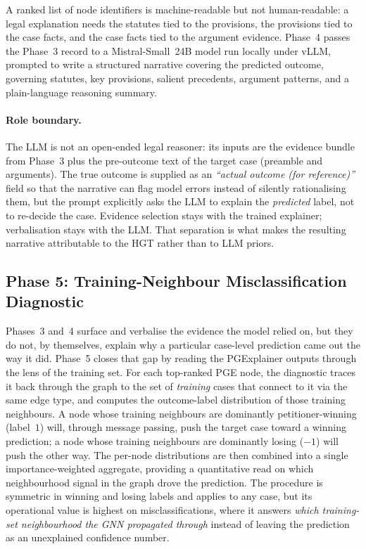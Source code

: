 A ranked list of node identifiers is machine-readable but not
human-readable: a legal explanation needs the statutes tied to the
provisions, the provisions tied to the case facts, and the case
facts tied to the argument evidence. Phase~4 passes the Phase~3
record to a Mistral-Small~24B model run locally under vLLM, prompted
to write a structured narrative covering the predicted outcome,
governing statutes, key provisions, salient precedents, argument
patterns, and a plain-language reasoning summary.

\paragraph{Role boundary.}
The LLM is not an open-ended legal reasoner: its inputs are the
evidence bundle from Phase~3 plus the pre-outcome text of the target
case (preamble and arguments). The true outcome is supplied as an
\emph{``actual outcome (for reference)''} field so that the
narrative can flag model errors instead of silently rationalising
them, but the prompt explicitly asks the LLM to explain the
\emph{predicted} label, not to re-decide the case. Evidence
selection stays with the trained explainer; verbalisation stays with
the LLM. That separation is what makes the resulting narrative
attributable to the HGT rather than to LLM priors.

\subsection{Phase 5: Training-Neighbour Misclassification Diagnostic}
\label{subsec:phase5_diagnostic}

Phases~3 and~4 surface and verbalise the evidence the model relied
on, but they do not, by themselves, explain why a particular
case-level prediction came out the way it did. Phase~5 closes that
gap by reading the PGExplainer outputs through the lens of the
training set. For each top-ranked PGE node, the diagnostic traces it
back through the graph to the set of \emph{training} cases that
connect to it via the same edge type, and computes the outcome-label
distribution of those training neighbours. A node whose training
neighbours are dominantly petitioner-winning (label~$1$) will,
through message passing, push the target case toward a winning
prediction; a node whose training neighbours are dominantly losing
($-1$) will push the other way. The per-node distributions are then
combined into a single importance-weighted aggregate, providing a
quantitative read on which neighbourhood signal in the graph drove
the prediction. The procedure is symmetric in winning and losing
labels and applies to any case, but its operational value is highest
on misclassifications, where it answers \emph{which training-set
neighbourhood the GNN propagated through} instead of leaving the
prediction as an unexplained confidence number.

